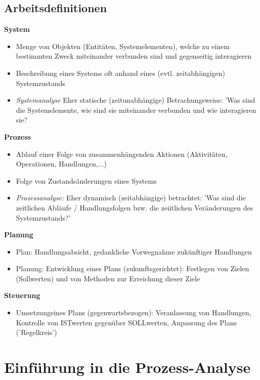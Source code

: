 \documentclass{report}
\theoremstyle{definition}
\theoremstyle{example}
\begin{document}
\section{Arbeitsdefinitionen}

\textbf{System}
\begin{itemize}
   \item Menge von Objekten (Entitäten, Systemelementen), welche zu einem bestimmten Zweck miteinander verbunden sind und gegenseitig interagieren
   \item Beschreibung eines Systems oft anhand eines (evtl. zeitabhängigen) Systemzustands
   \item \textit{Systemanalyse} Eher statische (zeitunabhängige) Betrachungsweise: 'Was sind die Systemelemente, wie sind sie miteinander verbunden und wie interagieren sie?
\end{itemize}

\textbf{Prozess}
\begin{itemize}
   \item Ablauf einer Folge von zusammenhängenden Aktionen (Aktivitäten, Operationen, Handlungen,...)
   \item Folge von Zustandsänderungen eines Systems
   \item \textit{Prozessanalyse:} Eher dynamisch (zeitabhängige) betrachtet: 'Was sind die zeitlichen Abläufe / Handlungsfolgen bzw. die zeiitlichen Veränderungen des Systemzustands?'
\end{itemize}

\textbf{Planung}
\begin{itemize}
   \item Plan: Handlungsabsicht, gedankliche Vorwegnahme zukünftiger Handlungen
   \item Planung: Entwicklung eines Plans (zukunftsgerichtet): Festlegen von Zielen (Sollwerten) und von Methoden zur Erreichung dieser Ziele
\end{itemize}

\textbf{Steuerung}
\begin{itemize}
   \item Umsetzungeines Plans (gegenwartsbezogen): Veranlassung von Handlungen, Kontrolle von ISTwerten gegenüber SOLLwerten, Anpassung des Plans ('Regelkreis')
\end{itemize}


\chapter{Einführung in die Prozess-Analyse}
\end{document}
